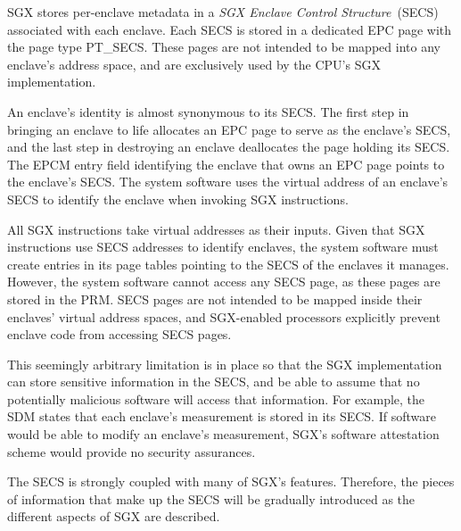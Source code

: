 \label{sec:sgx_secs}


SGX stores per-enclave metadata in a
\textit{SGX Enclave Control Structure}~(SECS) associated with each enclave.
Each SECS is stored in a dedicated EPC page with the page type PT\_SECS. These
pages are not intended to be mapped into any enclave's address space, and are
exclusively used by the CPU's SGX implementation.


An enclave's identity is almost synonymous to its SECS. The first step in
bringing an enclave to life allocates an EPC page to serve as the enclave's
SECS, and the last step in destroying an enclave deallocates the page holding
its SECS. The EPCM entry field identifying the enclave that owns an EPC page
points to the enclave's SECS. The system software uses the virtual address of
an enclave's SECS to identify the enclave when invoking SGX instructions.


All SGX instructions take virtual addresses as their inputs. Given that SGX
instructions use SECS addresses to identify enclaves, the system software must
create entries in its page tables pointing to the SECS of the enclaves it
manages. However, the system software cannot access any SECS page, as these
pages are stored in the PRM. SECS pages are not intended to be mapped inside
their enclaves' virtual address spaces, and SGX-enabled processors explicitly
prevent enclave code from accessing SECS pages.


This seemingly arbitrary limitation is in place so that the SGX implementation
can store sensitive information in the SECS, and be able to assume that no
potentially malicious software will access that information. For example, the
SDM states that each enclave's measurement is stored in its SECS. If software
would be able to modify an enclave's measurement, SGX's software attestation
scheme would provide no security assurances.

The SECS is strongly coupled with many of SGX's features. Therefore, the pieces
of information that make up the SECS will be gradually introduced as the
different aspects of SGX are described.
